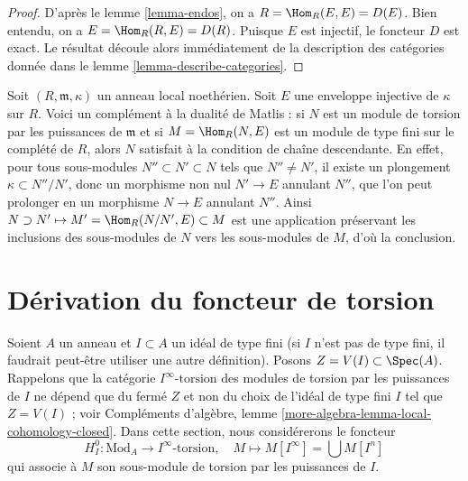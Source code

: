 \begin{proof}
D'après le lemme \ref{lemma-endos}, on a $R = \Hom_R(E, E) = D(E)$.
Bien entendu, on a $E = \Hom_R(R, E) = D(R)$. Puisque $E$ est injectif,
le foncteur $D$ est exact. Le résultat découle alors immédiatement
de la description des catégories donnée dans le lemme \ref{lemma-describe-categories}.
\end{proof}

\begin{remark}
\label{remark-matlis}
Soit $(R, \mathfrak m, \kappa)$ un anneau local noethérien.
Soit $E$ une enveloppe injective de $\kappa$ sur $R$.
Voici un complément à la dualité de Matlis : si $N$ est un module
de torsion par les puissances de $\mathfrak m$ et si $M = \Hom_R(N, E)$ est un module de type fini
sur le complété de $R$, alors $N$ satisfait à la condition de chaîne
descendante. En effet, pour tous sous-modules $N'' \subset N' \subset N$ tels que $N'' \not = N'$,
il existe un plongement $\kappa \subset N''/N'$, donc un morphisme non nul $N' \to E$
annulant $N''$, que l'on peut prolonger en un morphisme $N \to E$ annulant $N''$.
Ainsi $N \supset N' \mapsto M' = \Hom_R(N/N', E) \subset M$ est une application préservant les inclusions des sous-modules
de $N$ vers les sous-modules de $M$, d'où la conclusion.
\end{remark}




















\section{Dérivation du foncteur de torsion}
\label{section-bad-local-cohomology}

\noindent
Soient $A$ un anneau et $I \subset A$ un idéal de type fini
(si $I$ n'est pas de type fini, il faudrait peut-être utiliser
une autre définition). Posons $Z = V(I) \subset \Spec(A)$. Rappelons que la catégorie $I^\infty\text{-torsion}$
des modules de torsion par les puissances de $I$ ne dépend que
du fermé $Z$ et non du choix de l'idéal de type fini $I$ tel que $Z = V(I)$ ;
voir Compléments d'algèbre, lemme \ref{more-algebra-lemma-local-cohomology-closed}.
Dans cette section, nous considérerons le foncteur
$$
H^0_{I} : \text{Mod}_A \longrightarrow I^\infty\text{-torsion},\quad
M \longmapsto M[I^\infty] = \bigcup M[I^n]
$$
qui associe à $M$ son sous-module de torsion par les puissances de $I$.

